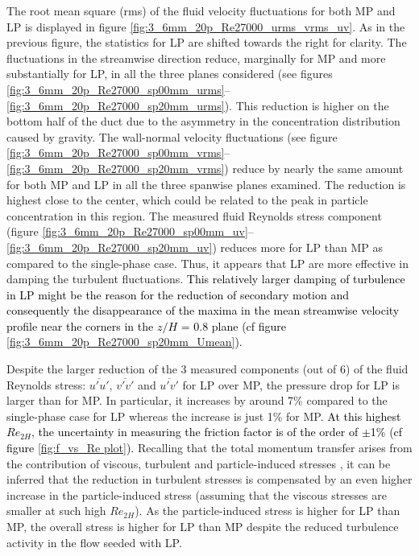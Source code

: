 \documentclass{jfm}
\def\sz#1{{\textcolor{black}{#1}}}
\begin{document}
The root mean square (rms) of the fluid velocity fluctuations for both MP and LP is displayed in figure \ref{fig:3_6mm_20p_Re27000_urms_vrms_uv}. As in the previous figure, the statistics for LP are shifted towards the right for clarity. The fluctuations in the streamwise direction reduce, marginally for MP and more substantially for LP, in all the three planes considered (see figures \ref{fig:3_6mm_20p_Re27000_sp00mm_urms}--\ref{fig:3_6mm_20p_Re27000_sp20mm_urms}). 
This reduction is higher on the bottom half of the duct due to the asymmetry in the concentration distribution caused by gravity. 
The wall-normal velocity fluctuations (see figure \ref{fig:3_6mm_20p_Re27000_sp00mm_vrms}--\ref{fig:3_6mm_20p_Re27000_sp20mm_vrms}) reduce by nearly the same amount for both MP and LP in all the three spanwise planes examined. The reduction is highest close to the center, which could be related to the peak in particle concentration in this region. The  measured fluid Reynolds stress component (figure \ref{fig:3_6mm_20p_Re27000_sp00mm_uv}--\ref{fig:3_6mm_20p_Re27000_sp20mm_uv}) reduces more for LP than MP as compared to the single-phase case. Thus, it appears that LP are more effective in damping the turbulent fluctuations. \sz{This relatively larger damping of turbulence in LP might be the reason for the reduction of secondary motion and consequently the disappearance of the maxima in the mean streamwise velocity profile near the corners in the $z/H$ = 0.8 plane (cf figure \ref{fig:3_6mm_20p_Re27000_sp20mm_Umean}).}


Despite the larger reduction of the 3 measured components (out of 6) of the fluid Reynolds stress: $\overline{u'u'}$, $\overline{v'v'}$ and $\overline{u'v'}$ for LP over MP, the pressure drop for LP is larger than for MP. In particular, it increases by around 7\% compared to the single-phase case for LP whereas the increase is just 1\% for MP. \sz{At this highest $Re_{2H}$, the uncertainty in measuring the friction factor is of the order of $\pm$1\% (cf figure \ref{fig:f_vs_Re plot}).}
%
Recalling that the total momentum transfer 
arises from the contribution of viscous, turbulent and particle-induced stresses \citep{lashgari2014laminar},  it can be inferred that the reduction in turbulent stresses is compensated by an even higher increase in the particle-induced stress (assuming that the viscous stresses are smaller at such high $Re_{2H}$). As the particle-induced stress is  higher for LP than MP, the overall stress is higher for LP than MP despite the reduced turbulence activity in the flow seeded with LP.\\
\end{document}
